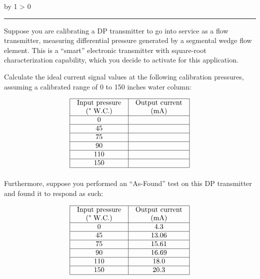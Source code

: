 \documentclass[12pt,a4paper]{article}
\def\oppgave{
            \advance\questnum by 1
            \ifnum \questnum > 0
                 \hrule
                 \vskip 3pt
                 \leftline{Oppgave \the\questnum}
                 \vskip 3pt \fi}
\begin{document}

\vfil \eject 

\oppgave{} 

Suppose you are calibrating a DP transmitter to go into service as a flow transmitter, measuring differential pressure generated by a segmental wedge flow element.  This is a ``smart'' electronic transmitter with square-root characterization capability, which you decide to activate for this application.

Calculate the ideal current signal values at the following calibration pressures, assuming a calibrated range of 0 to 150 inches water column:


$$\vbox{\offinterlineskip
\halign{\strut
\vrule \quad\hfil # \ \hfil & 
\vrule \quad\hfil # \ \hfil \vrule \cr
\noalign{\hrule}
%
Input pressure & Output current \cr
(" W.C.) & (mA) \cr
%
\noalign{\hrule}
%
0 &  \cr
%
\noalign{\hrule}
%
45 &  \cr
%
\noalign{\hrule}
%
75 &  \cr
%
\noalign{\hrule}
%
90 &  \cr
%
\noalign{\hrule}
%
110 &  \cr
%
\noalign{\hrule}
%
150 &  \cr
%
\noalign{\hrule}
} %
}$$ %

Furthermore, suppose you performed an ``As-Found'' test on this DP transmitter and found it to respond as such:


$$\vbox{\offinterlineskip
\halign{\strut
\vrule \quad\hfil # \ \hfil & 
\vrule \quad\hfil # \ \hfil \vrule \cr
\noalign{\hrule}
%
Input pressure & Output current \cr
(" W.C.) & (mA) \cr
%
\noalign{\hrule}
%
0 & 4.3 \cr
%
\noalign{\hrule}
%
45 & 13.06 \cr
%
\noalign{\hrule}
%
75 & 15.61 \cr
%
\noalign{\hrule}
%
90 & 16.69 \cr
%
\noalign{\hrule}
%
110 & 18.0 \cr
%
\noalign{\hrule}
%
150 & 20.3 \cr
%
\noalign{\hrule}
} %
}$$ %
\end{document}
